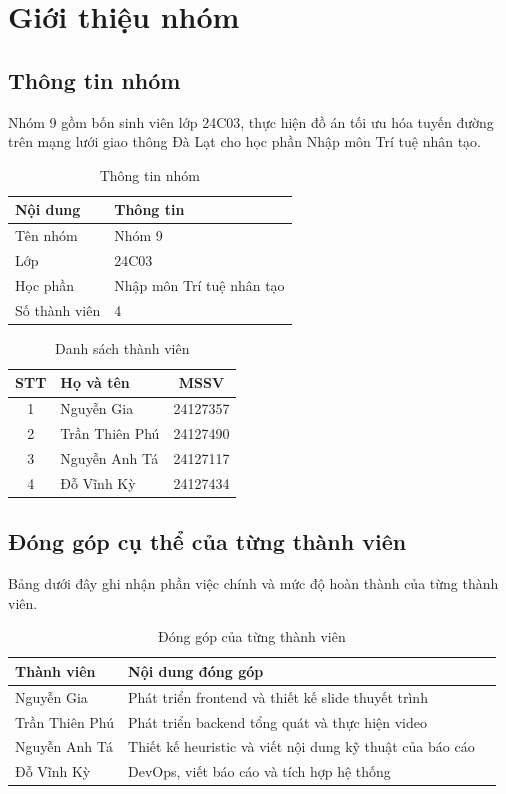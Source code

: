 
\chapter{Giới thiệu nhóm}
\label{chap:group-introduction}

\section{Thông tin nhóm}

Nhóm 9 gồm bốn sinh viên lớp 24C03, thực hiện đồ án tối ưu hóa tuyến đường
trên mạng lưới giao thông Đà Lạt cho học phần Nhập môn Trí tuệ nhân tạo.

\begin{table}[h!]
\centering
\caption{Thông tin nhóm}
\begin{tabular}{ll}
\toprule
Nội dung & Thông tin \\
\midrule
Tên nhóm & Nhóm 9 \\
Lớp & 24C03 \\
Học phần & Nhập môn Trí tuệ nhân tạo \\
Số thành viên & 4 \\
\bottomrule
\end{tabular}
\end{table}

\begin{table}[h!]
\centering
\caption{Danh sách thành viên}
\begin{tabular}{clc}
\toprule
STT & Họ và tên & MSSV \\
\midrule
1 & Nguyễn Gia & 24127357 \\
2 & Trần Thiên Phú & 24127490 \\
3 & Nguyễn Anh Tá & 24127117 \\
4 & Đỗ Vĩnh Kỳ & 24127434 \\
\bottomrule
\end{tabular}
\end{table}

\section{Đóng góp cụ thể của từng thành viên}

Bảng dưới đây ghi nhận phần việc chính và mức độ hoàn thành của từng thành viên.

\begin{table}[h!]
\centering
\caption{Đóng góp của từng thành viên}
\begin{tabular}{p{3.2cm}p{8.2cm}p{2cm}}
\toprule
Thành viên & Nội dung đóng góp\\
\midrule
Nguyễn Gia & Phát triển frontend và thiết kế slide thuyết trình\\
Trần Thiên Phú & Phát triển backend tổng quát và thực hiện video\\
Nguyễn Anh Tá & Thiết kế heuristic và viết nội dung kỹ thuật của báo cáo\\
Đỗ Vĩnh Kỳ & DevOps, viết báo cáo và tích hợp hệ thống\\
\bottomrule
\end{tabular}
\end{table}

